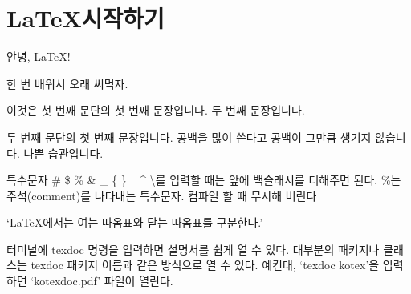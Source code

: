 \documentclass[oneside, a4paper]{article}
\begin{document}
\section[시작]{\LaTeX 시작하기}  
\begin{center}
안녕, \LaTeX!
\end{center}
한 번 배워서 오래 써먹자. \par  %
이것은 첫 번째 문단의 첫 번째 문장입니다. 두 번째 문장입니다.

두 번째 문단의 첫 번째 문장입니다. 공백을 많이 쓴다고
공백이 그만큼 생기지 않습니다. 나쁜 습관입니다.

특수문자 \# \$ \% \& \_ \{ \} \string~ \string^ \textbackslash 를
입력할 때는 앞에 백슬래시를 더해주면 된다. 
\%는 주석(comment)를 나타내는 특수문자.  컴파일
할 때 무시해 버린다 

`\LaTeX 에서는 여는 따옴표와 닫는 따옴표를 구분한다.'

터미널에 texdoc 명령을 입력하면 설명서를 쉽게 열 수 있다.
대부분의 패키지나 클래스는 texdoc 패키지 이름과 같은 방식으로 열 수 있다. 
예컨대, `texdoc kotex'을 입력하면 `kotexdoc.pdf' 파일이 열린다. 
\end{document}
